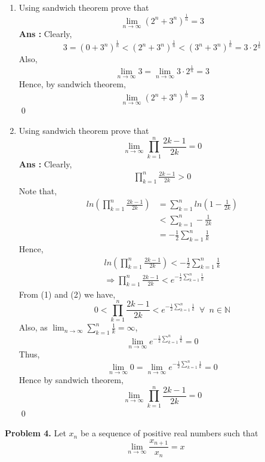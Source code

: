 \documentclass[10pt]{article}
\newcommand{\inflim}{\lim_{n\to\infty}}
\newcommand{\sol}{\textbf{Ans : }}
\begin{document}
        \begin{enumerate}[label = {(\roman*)}]
        \item Using sandwich theorem prove that $$\lim_{n \to \infty} (2^n + 3^n)^{\frac{1}{n}} = 3$$
        \sol Clearly,
        $$3 = (0 + 3^n)^{\frac{1}{n}} < (2^n + 3^n)^\frac{1}{n}< (3^n + 
         3^n)^\frac{1}{n} = 3\cdot2^\frac{1}{n}$$
         Also, $$\lim_{n\to\infty} 3 = \lim_{n\to\infty} 3\cdot2^\frac{1}{n} = 3$$ Hence, by sandwich theorem,
         $$\lim_{n\to\infty} (2^n + 3^n)^\frac{1}{n} = 3$$ \qed\\
        \item Using sandwich theorem prove that $$\lim_{n\to\infty} \prod_{k=1}^{n} \frac{2k-1}{2k} = 0$$
        \sol Clearly,
        \begin{align*}
            \prod_{k=1}^{n} \frac{2k-1}{2k} > 0 \tag{1}
        \end{align*}
        Note that, 
        \begin{align*}
            ln\left(\prod_{k=1}^{n} \frac{2k-1}{2k}\right) 
            &= \sum_{k=1}^{n} ln \left( 1 - \frac{1}{2k}\right)\\
            &< \sum_{k = 1}^n -\frac{1}{2k} \tag{$ \because ln(1 + x) < x \,\,\, \forall x > -1$}\\
            &= -\frac{1}{2}\sum_{k=1}^n \frac{1}{k}
        \end{align*}
        Hence, 
        \begin{align*}
            ln\left(\prod_{k=1}^{n} \frac{2k-1}{2k}\right)  < -\frac{1}{2}\sum_{k=1}^n \frac{1}{k}\\
            \Rightarrow \prod_{k=1}^{n} \frac{2k-1}{2k}< e^{-\frac{1}{2}\sum_{k=1}^n \frac{1}{k}} \tag{2}
        \end{align*}
        From (1) and (2) we have,
        $$0<\prod_{k=1}^{n} \frac{2k-1}{2k}< e^{-\frac{1}{2}\sum_{k=1}^n \frac{1}{k}} \,\,\, \forall \,\,\,n \in \mathbb{N}$$
        Also, as $\lim_{n\to\infty} \sum_{k=1}^{n} \frac{1}{k} = \infty$, 
        $$\lim_{n\to\infty} e^{-\frac{1}{2}\sum_{k=1}^n \frac{1}{k}} = 0$$ 
        Thus, 
        $$\lim_{n\to\infty} 0 = \lim_{n\to\infty} e^{-\frac{1}{2}\sum_{k=1}^n \frac{1}{k}} = 0$$
        Hence by sandwich theorem, 
        $$\lim_{n\to\infty} \prod_{k=1}^{n} \frac{2k-1}{2k} = 0$$ \qed \\
        \end{enumerate} \clearpage
        \textbf{Problem 4.} Let $x_n$ be a sequence of positive real numbers such that $$\inflim \frac{x_{n+1}}{x_n} = x $$
\end{document}
